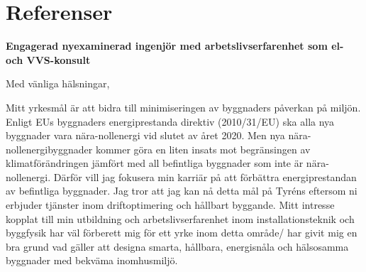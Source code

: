 \documentclass[11pt,a4paper,roman]{moderncv}        %
\begin{document}
\section{Referenser}


%


\clearpage
\date{\today}
\opening{\textbf{Engagerad nyexaminerad ingenj{\"o}r med arbetslivserfarenhet som el- och VVS-konsult}}
\closing{Med v{\"a}nliga h{\"a}lsningar,}
\makelettertitle

Mitt yrkesm{\aa}l {\"a}r att bidra till minimiseringen av byggnaders p{\aa}verkan p{\aa} milj{\"o}n.
Enligt EUs byggnaders energiprestanda direktiv (2010/31/EU) ska alla nya byggnader vara nära-nollenergi vid slutet av {\aa}ret 2020.
Men nya nära-nollenergibyggnader kommer g{\"o}ra en liten insats mot begr{\"a}nsingen av klimatf{\"o}r{\"a}ndringen j{\"a}mf{\"o}rt med all befintliga byggnader som inte {\"a}r nära-nollenergi.
D{\"a}rf{\"o}r vill jag fokusera min karri{\"a}r p{\aa} att f{\"o}rb{\"a}ttra energiprestandan av befintliga byggnader.
Jag tror att jag kan n{\aa} detta m{\aa}l p{\aa} Tyr{\'e}ns eftersom ni erbjuder tj{\"a}nster inom driftoptimering och h{\aa}llbart byggande. %
Mitt intresse %
kopplat till min utbildning och arbetslivserfarenhet inom installationsteknik och byggfysik har v{\"a}l f{\"o}rberett mig f{\"o}r ett yrke inom detta omr{\aa}de/ har givit mig en bra grund vad g{\"a}ller att designa smarta, h{\aa}llbara, energisn{\aa}la och h{\"a}lsosamma byggnader med bekv{\"a}ma inomhusmilj{\"o}.
\end{document}
